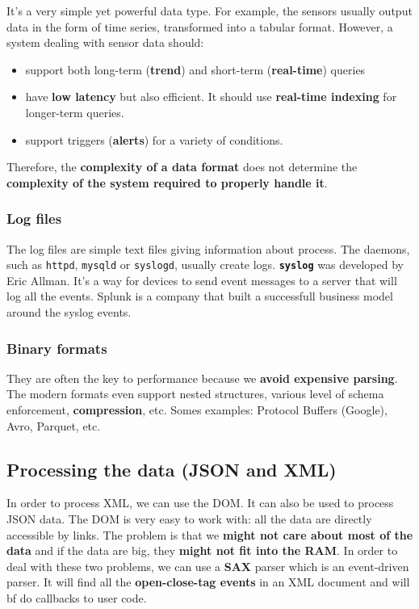 \documentclass[a4paper,11pt,twoside]{article}
\begin{document}
It's a very simple yet powerful data type. For example, the sensors usually output data in the form of time series, transformed into a tabular format. However, a system dealing with sensor data should:
\begin{itemize}
 \item support both long-term ({\bf trend}) and short-term ({\bf real-time}) queries
 \item have {\bf low latency} but also efficient. It should use {\bf real-time indexing} for longer-term queries.
 \item support triggers ({\bf alerts}) for a variety of conditions.
\end{itemize}
Therefore, the {\bf complexity of a data format} does not determine the {\bf complexity of the system required to properly handle it}.

\subsubsection{Log files}

The log files are simple text files giving information about process. The daemons, such as \verb+httpd+, \verb+mysqld+ or \verb+syslogd+, usually create logs. {\bf \verb+syslog+} was developed by Eric Allman. It's a way for devices to send event messages to a server that will log all the events. Splunk is a company that built a successfull business model around the syslog events.

\subsubsection{Binary formats}

They are often the key to performance because we {\bf avoid expensive parsing}. The modern formats even support nested structures, various level of schema enforcement, {\bf compression}, etc. Somes examples: Protocol Buffers (Google), Avro, Parquet, etc.

\subsection{Processing the data (JSON and XML)}

In order to process XML, we can use the DOM. It can also be used to process JSON data. The DOM is very easy to work with: all the data are directly accessible by links. The problem is that we {\bf might not care about most of the data} and if the data are big, they {\bf might not fit into the RAM}. In order to deal with these two problems, we can use a {\bf SAX} parser which is an event-driven parser. It will find all the {\bf open-close-tag events} in an XML document and will {bf do callbacks to user code}.
\end{document}
